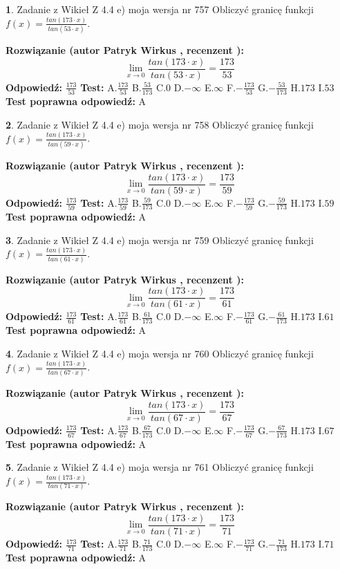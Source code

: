 \documentclass[12pt, a4paper]{article}
\theoremstyle{definition} %
\newtheorem{zad}{}
\newcommand{\zadStart}[1]{\begin{zad}#1\newline}
\newcommand{\zadStop}{\end{zad}}
\newcommand{\rozwStart}[2]{\noindent \textbf{Rozwiązanie (autor #1 , recenzent #2): }\newline}
\newcommand{\rozwStop}{\newline}
\newcommand{\odpStart}{\noindent \textbf{Odpowiedź:}\newline}
\newcommand{\odpStop}{\newline}
\newcommand{\testStart}{\noindent \textbf{Test:}\newline}
\newcommand{\testStop}{\newline}
\newcommand{\kluczStart}{\noindent \textbf{Test poprawna odpowiedź:}\newline}
\newcommand{\kluczStop}{\newline}
\begin{document}
\zadStart{Zadanie z Wikieł Z 4.4 e) moja wersja nr 757}
Obliczyć granicę funkcji $f(x)=\frac{tan(173\cdot x)}{tan(53\cdot x)}$.
\zadStop
\rozwStart{Patryk Wirkus}{}
$$\lim\limits_{x\to 0}\frac{tan(173\cdot x)}{tan(53\cdot x)}=
\frac{173}{53}$$
\rozwStop
\odpStart
$\frac{173}{53}$
\odpStop
\testStart
A.$\frac{173}{53}$
B.$\frac{53}{173}$
C.$0$
D.$-\infty$
E.$\infty$
F.$-\frac{173}{53}$
G.$-\frac{53}{173}$
H.$173$
I.$53$
\testStop
\kluczStart
A
\kluczStop



\zadStart{Zadanie z Wikieł Z 4.4 e) moja wersja nr 758}
Obliczyć granicę funkcji $f(x)=\frac{tan(173\cdot x)}{tan(59\cdot x)}$.
\zadStop
\rozwStart{Patryk Wirkus}{}
$$\lim\limits_{x\to 0}\frac{tan(173\cdot x)}{tan(59\cdot x)}=
\frac{173}{59}$$
\rozwStop
\odpStart
$\frac{173}{59}$
\odpStop
\testStart
A.$\frac{173}{59}$
B.$\frac{59}{173}$
C.$0$
D.$-\infty$
E.$\infty$
F.$-\frac{173}{59}$
G.$-\frac{59}{173}$
H.$173$
I.$59$
\testStop
\kluczStart
A
\kluczStop



\zadStart{Zadanie z Wikieł Z 4.4 e) moja wersja nr 759}
Obliczyć granicę funkcji $f(x)=\frac{tan(173\cdot x)}{tan(61\cdot x)}$.
\zadStop
\rozwStart{Patryk Wirkus}{}
$$\lim\limits_{x\to 0}\frac{tan(173\cdot x)}{tan(61\cdot x)}=
\frac{173}{61}$$
\rozwStop
\odpStart
$\frac{173}{61}$
\odpStop
\testStart
A.$\frac{173}{61}$
B.$\frac{61}{173}$
C.$0$
D.$-\infty$
E.$\infty$
F.$-\frac{173}{61}$
G.$-\frac{61}{173}$
H.$173$
I.$61$
\testStop
\kluczStart
A
\kluczStop



\zadStart{Zadanie z Wikieł Z 4.4 e) moja wersja nr 760}
Obliczyć granicę funkcji $f(x)=\frac{tan(173\cdot x)}{tan(67\cdot x)}$.
\zadStop
\rozwStart{Patryk Wirkus}{}
$$\lim\limits_{x\to 0}\frac{tan(173\cdot x)}{tan(67\cdot x)}=
\frac{173}{67}$$
\rozwStop
\odpStart
$\frac{173}{67}$
\odpStop
\testStart
A.$\frac{173}{67}$
B.$\frac{67}{173}$
C.$0$
D.$-\infty$
E.$\infty$
F.$-\frac{173}{67}$
G.$-\frac{67}{173}$
H.$173$
I.$67$
\testStop
\kluczStart
A
\kluczStop



\zadStart{Zadanie z Wikieł Z 4.4 e) moja wersja nr 761}
Obliczyć granicę funkcji $f(x)=\frac{tan(173\cdot x)}{tan(71\cdot x)}$.
\zadStop
\rozwStart{Patryk Wirkus}{}
$$\lim\limits_{x\to 0}\frac{tan(173\cdot x)}{tan(71\cdot x)}=
\frac{173}{71}$$
\rozwStop
\odpStart
$\frac{173}{71}$
\odpStop
\testStart
A.$\frac{173}{71}$
B.$\frac{71}{173}$
C.$0$
D.$-\infty$
E.$\infty$
F.$-\frac{173}{71}$
G.$-\frac{71}{173}$
H.$173$
I.$71$
\testStop
\kluczStart
A
\kluczStop
\end{document}
